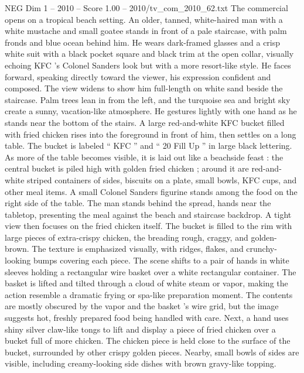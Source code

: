 \begin{textsample}{NEG Dim 1 – 2010 – Score 1.00 – 2010/tv\_com\_2010\_62.txt}  \label{ex:f1_neg_076}
The commercial opens on a tropical beach setting.
An older, tanned, white-haired man with a white mustache and small goatee stands in front of a pale staircase, with palm fronds and blue ocean behind him.
He wears dark-framed glasses and a crisp white suit with a black pocket square and black trim at the open collar, visually echoing KFC ’s Colonel Sanders look but with a more resort-like style.
He faces forward, speaking directly toward the viewer, his expression confident and composed.
The view widens to show him full-length on white sand beside the staircase.
Palm trees lean in from the left, and the turquoise sea and bright sky create a sunny, vacation-like atmosphere.
He gestures lightly with one hand as he stands near the bottom of the stairs.
A large red-and-white KFC bucket filled with fried chicken rises into the foreground in front of him, then settles on a long table.
The bucket is labeled “ KFC ” and “ 20 Fill Up ” in large black lettering.
As more of the table becomes visible, it is laid out like a beachside feast : the central bucket is piled high with golden fried chicken ; around it are red-and-white striped containers of sides, biscuits on a plate, small bowls, KFC cups, and other meal items.
A small Colonel Sanders figurine stands among the food on the right side of the table.
The man stands behind the spread, hands near the tabletop, presenting the meal against the beach and staircase backdrop.
A tight view then focuses on the fried chicken itself.
The bucket is filled to the rim with large pieces of extra-crispy chicken, the breading rough, craggy, and golden-brown.
The texture is emphasized visually, with ridges, flakes, and crunchy-looking bumps covering each piece.
The scene shifts to a pair of hands in white sleeves holding a rectangular wire basket over a white rectangular container.
The basket is lifted and tilted through a cloud of white steam or vapor, making the action resemble a dramatic frying or spa-like preparation moment.
The contents are mostly obscured by the vapor and the basket ’s wire grid, but the image suggests hot, freshly prepared food being handled with care.
Next, a hand uses shiny silver claw-like tongs to lift and display a piece of fried chicken over a bucket full of more chicken.
The chicken piece is held close to the surface of the bucket, surrounded by other crispy golden pieces.
Nearby, small bowls of sides are visible, including creamy-looking side dishes with brown gravy-like topping.

\end{textsample}
